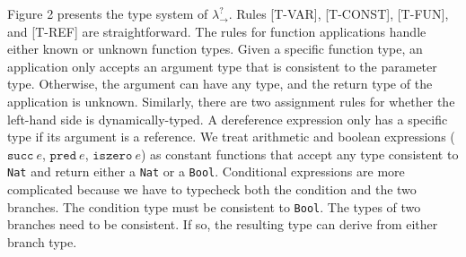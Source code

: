 Figure 2 presents the type system of $\lambda ^? _{\rightarrow}$. Rules 
{\scriptsize{[T-VAR]}}, {\scriptsize{[T-CONST]}}, {\scriptsize{[T-FUN]}}, 
and {\scriptsize{[T-REF]}}  
are straightforward. The rules for function applications handle either 
known or unknown function types. Given a specific function type, an 
application only accepts an argument type that is consistent to the 
parameter type.  
Otherwise, the argument can have any type, and the return 
type of the application is unknown. Similarly, there are two assignment 
rules for whether the left-hand side is dynamically-typed. 
A dereference expression only has a specific type if its argument is a 
reference. We treat arithmetic 
and boolean expressions ($\texttt{succ} \: e$, $\texttt{pred} \: e$, $\texttt{iszero} \: e$) 
as constant functions that accept any type consistent to \texttt{Nat} and 
return either a \texttt{Nat} or a \texttt{Bool}. Conditional expressions are more 
complicated because we have to typecheck both the condition and the two 
branches. The condition type must be consistent to 
\texttt{Bool}. The types of two branches need to be consistent. If so, the 
resulting type can derive from either branch type.
